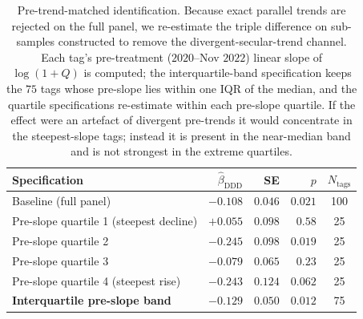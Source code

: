 \begin{table}[ht]
\centering
\caption{Pre-trend-matched identification. Because exact parallel trends
are rejected on the full panel, we re-estimate the triple difference on
sub-samples constructed to remove the divergent-secular-trend channel.
Each tag's pre-treatment ($2020$--Nov $2022$) linear slope of
$\log(1+Q)$ is computed; the interquartile-band specification keeps the
$75$ tags whose pre-slope lies within one IQR of the median, and the
quartile specifications re-estimate within each pre-slope quartile.
If the effect were an artefact of divergent pre-trends it would
concentrate in the steepest-slope tags; instead it is present in the
near-median band and is not strongest in the extreme quartiles.}
\label{tab:matched_pretrend}
\small
\begin{tabular}{lrrrc}
\toprule
Specification & $\hat\beta_{\text{DDD}}$ & SE & $p$ & $N_{\text{tags}}$ \\
\midrule
Baseline (full panel)                 & $-0.108$ & $0.046$ & $0.021$ & 100 \\
\midrule
Pre-slope quartile 1 (steepest decline) & $+0.055$ & $0.098$ & $0.58$  & 25 \\
Pre-slope quartile 2                    & $-0.245$ & $0.098$ & $0.019$ & 25 \\
Pre-slope quartile 3                    & $-0.079$ & $0.065$ & $0.23$  & 25 \\
Pre-slope quartile 4 (steepest rise)    & $-0.243$ & $0.124$ & $0.062$ & 25 \\
\midrule
\textbf{Interquartile pre-slope band}   & $\mathbf{-0.129}$ & $\mathbf{0.050}$ & $\mathbf{0.012}$ & 75 \\
\bottomrule
\end{tabular}
\end{table}
